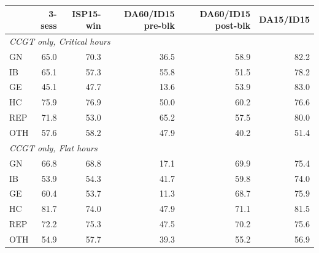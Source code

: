 \begin{tabular}{l r r r r r}
\toprule
 & 3-sess & ISP15-win & DA60/ID15 pre-blk & DA60/ID15 post-blk & DA15/ID15 \\
\midrule
\multicolumn{6}{l}{\textit{CCGT only, Critical hours}} \\
GN & 65.0 & 70.3 & 36.5 & 58.9 & 82.2 \\
IB & 65.1 & 57.3 & 55.8 & 51.5 & 78.2 \\
GE & 45.1 & 47.7 & 13.6 & 53.9 & 83.0 \\
HC & 75.9 & 76.9 & 50.0 & 60.2 & 76.6 \\
REP & 71.8 & 53.0 & 65.2 & 57.5 & 80.0 \\
OTH & 57.6 & 58.2 & 47.9 & 40.2 & 51.4 \\
\midrule
\multicolumn{6}{l}{\textit{CCGT only, Flat hours}} \\
GN & 66.8 & 68.8 & 17.1 & 69.9 & 75.4 \\
IB & 53.9 & 54.3 & 41.7 & 59.8 & 74.0 \\
GE & 60.4 & 53.7 & 11.3 & 68.7 & 75.9 \\
HC & 81.7 & 74.0 & 47.9 & 71.1 & 81.5 \\
REP & 72.2 & 75.3 & 47.5 & 70.2 & 75.6 \\
OTH & 54.9 & 57.7 & 39.3 & 55.2 & 56.9 \\
\midrule
\bottomrule
\end{tabular}
